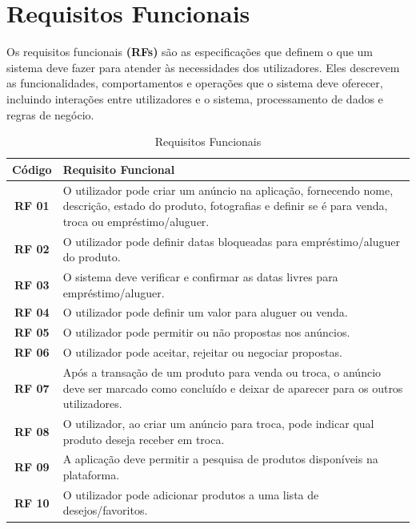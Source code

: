 \documentclass[a4paper, 12pt]{article} %
\begin{document}

\newpage
\section{Requisitos Funcionais}
Os requisitos funcionais \textbf{(RFs)} são as especificações que definem o que um sistema deve fazer para atender às necessidades dos utilizadores. Eles descrevem as funcionalidades, comportamentos e operações que o sistema deve oferecer, incluindo interações entre utilizadores e o sistema, processamento de dados e regras de negócio.

\begin{table}[H]
	\centering
	\renewcommand{\arraystretch}{1.3}
	\begin{tabular}{|c|p{12cm}|}
		\hline
		\textbf{Código} & \textbf{Requisito Funcional} \\
		\hline
		\textbf{RF 01} & O utilizador pode criar um anúncio na aplicação, fornecendo nome, descrição, estado do produto, fotografias e definir se é para venda, troca ou empréstimo/aluguer. \\
		\hline
		\textbf{RF 02} & O utilizador pode definir datas bloqueadas para empréstimo/aluguer do produto. \\
		\hline
		\textbf{RF 03} & O sistema deve verificar e confirmar as datas livres para empréstimo/aluguer. \\
		\hline
		\textbf{RF 04} & O utilizador pode definir um valor para aluguer ou venda. \\
		\hline
		\textbf{RF 05} & O utilizador pode permitir ou não propostas nos anúncios. \\
		\hline
		\textbf{RF 06} & O utilizador pode aceitar, rejeitar ou negociar propostas. \\
		\hline
		\textbf{RF 07} & Após a transação de um produto para venda ou troca, o anúncio deve ser marcado como concluído e deixar de aparecer para os outros utilizadores. \\
		\hline
		\textbf{RF 08} & O utilizador, ao criar um anúncio para troca, pode indicar qual produto deseja receber em troca. \\
		\hline
		\textbf{RF 09} & A aplicação deve permitir a pesquisa de produtos disponíveis na plataforma. \\
		\hline
		\textbf{RF 10} & O utilizador pode adicionar produtos a uma lista de desejos/favoritos. \\
		\hline
	\end{tabular}
	\caption{Requisitos Funcionais}
	\label{tab:requisitos_funcionais}
\end{table}
\end{document}
